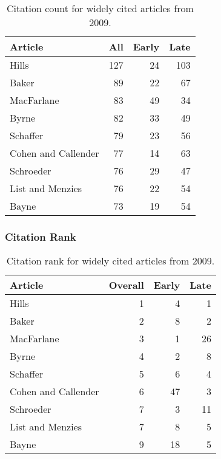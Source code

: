 \documentclass[
  10pt,
  letterpaper,
  DIV=11,
  numbers=noendperiod,
  twoside]{scrartcl}
\begin{document}
\begin{longtable}[]{@{}lrrr@{}}

\caption{\label{tbl-citation-count-2009}Citation count for widely cited
articles from 2009.}

\tabularnewline

\toprule\noalign{}
Article & All & Early & Late \\
\midrule\noalign{}
\endhead
\bottomrule\noalign{}
\endlastfoot
Hills & 127 & 24 & 103 \\
Baker & 89 & 22 & 67 \\
MacFarlane & 83 & 49 & 34 \\
Byrne & 82 & 33 & 49 \\
Schaffer & 79 & 23 & 56 \\
Cohen and Callender & 77 & 14 & 63 \\
Schroeder & 76 & 29 & 47 \\
List and Menzies & 76 & 22 & 54 \\
Bayne & 73 & 19 & 54 \\

\end{longtable}

\subsubsection*{Citation Rank}\label{sec-rank-2009}

\begin{longtable}[]{@{}lrrr@{}}

\caption{\label{tbl-citation-rank-2009}Citation rank for widely cited
articles from 2009.}

\tabularnewline

\toprule\noalign{}
Article & Overall & Early & Late \\
\midrule\noalign{}
\endhead
\bottomrule\noalign{}
\endlastfoot
Hills & 1 & 4 & 1 \\
Baker & 2 & 8 & 2 \\
MacFarlane & 3 & 1 & 26 \\
Byrne & 4 & 2 & 8 \\
Schaffer & 5 & 6 & 4 \\
Cohen and Callender & 6 & 47 & 3 \\
Schroeder & 7 & 3 & 11 \\
List and Menzies & 7 & 8 & 5 \\
Bayne & 9 & 18 & 5 \\

\end{longtable}
\end{document}

